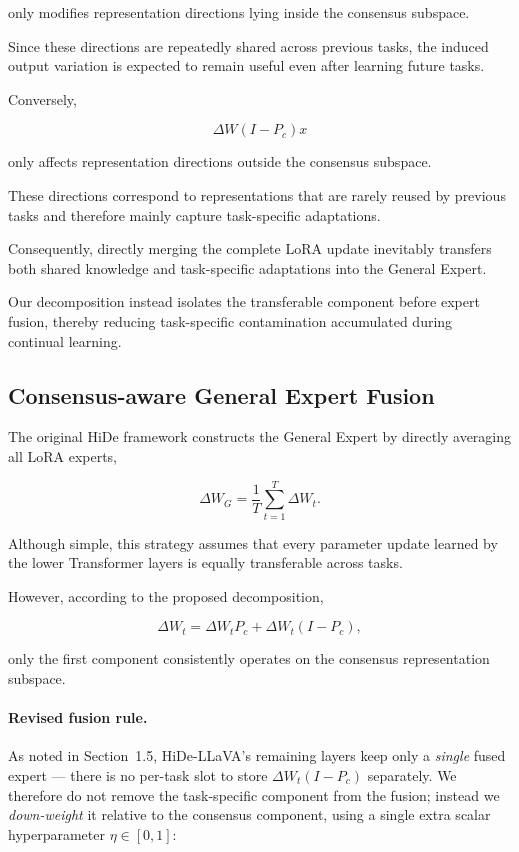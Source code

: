 \documentclass[a4paper]{article}
\begin{document}
only modifies representation directions lying inside the consensus subspace.

Since these directions are repeatedly shared across previous tasks, the induced output variation is expected to remain useful even after learning future tasks.

Conversely,

\[
\Delta W(I-P_c)x
\]

only affects representation directions outside the consensus subspace.

These directions correspond to representations that are rarely reused by previous tasks and therefore mainly capture task-specific adaptations.

Consequently, directly merging the complete LoRA update inevitably transfers both shared knowledge and task-specific adaptations into the General Expert.

Our decomposition instead isolates the transferable component before expert fusion, thereby reducing task-specific contamination accumulated during continual learning.

\subsection{Consensus-aware General Expert Fusion}

The original HiDe framework constructs the General Expert by directly averaging all LoRA experts,

\begin{equation}
\Delta W_G
=
\frac1T
\sum_{t=1}^{T}
\Delta W_t.
\end{equation}

Although simple, this strategy assumes that every parameter update learned by the lower Transformer layers is equally transferable across tasks.

However, according to the proposed decomposition,

\[
\Delta W_t
=
\Delta W_tP_c
+
\Delta W_t(I-P_c),
\]

only the first component consistently operates on the consensus representation subspace.

\paragraph{Revised fusion rule.} As noted in Section~1.5, HiDe-LLaVA's remaining layers keep only a \emph{single} fused expert — there is no per-task slot to store $\Delta W_t(I-P_c)$ separately. We therefore do not remove the task-specific component from the fusion; instead we \emph{down-weight} it relative to the consensus component, using a single extra scalar hyperparameter $\eta\in[0,1]$:
\end{document}
